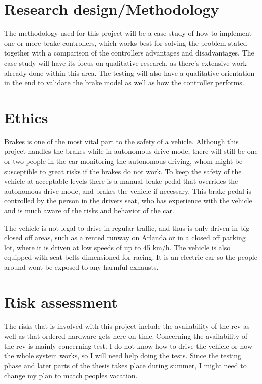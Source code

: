 \documentclass[a4paper,11pt]{kth-mag}
\begin{document}
\section{Research design/Methodology}
The methodology used for this project will be a case study of how to implement one or more brake controllers, which works best for solving the problem stated together with a comparison of the controllers advantages and disadvantages. The case study will have its focus on qualitative research, as there's extensive work already done within this area. The testing will also have a qualitative orientation in the end to validate the brake model as well as how the controller performs. 


\section{Ethics}
Brakes is one of the most vital part to the safety of a vehicle. Although this project handles the brakes while in autonomous drive mode, there will still be one or two people in the car monitoring the autonomous driving, whom might be susceptible to great risks if the brakes do not work. To keep the safety of the vehicle at acceptable levels there is a manual brake pedal that overrides the autonomous drive mode, and brakes the vehicle if necessary. This brake pedal is controlled by the person in the drivers seat, who has experience with the vehicle and is much aware of the risks and behavior of the car. 

The vehicle is not legal to drive in regular traffic, and thus is only driven in big closed off areas, such as a rented runway on Arlanda or in a closed off parking lot, where it is driven at low speeds of up to 45 km/h. The vehicle is also equipped with seat belts dimensioned for racing. 
It is an electric car so the people around wont be exposed to any harmful exhausts. 


\section{Risk assessment}
The risks that is involved with this project include the availability of the \gls{rcv} as well as that ordered hardware gets here on time. Concerning the availability of the \gls{rcv} is mainly concerning test. I do not know how to drive the vehicle or how the whole system works, so I will need help doing the tests. Since the testing phase and later parts of the thesis takes place during summer, I might need to change my plan to match peoples vacation. \newline
\end{document}
